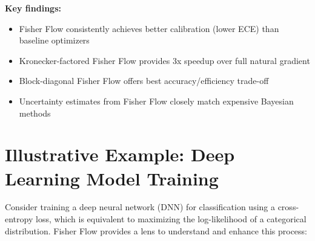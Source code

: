 \documentclass[11pt]{article}
\begin{document}
\textbf{Key findings:}
\begin{itemize}
\item Fisher Flow consistently achieves better calibration (lower ECE) than baseline optimizers
\item Kronecker-factored Fisher Flow provides 3x speedup over full natural gradient
\item Block-diagonal Fisher Flow offers best accuracy/efficiency trade-off
\item Uncertainty estimates from Fisher Flow closely match expensive Bayesian methods
\end{itemize}

\section{Illustrative Example: Deep Learning Model Training}
Consider training a deep neural network (DNN) for classification using a cross-entropy loss, which is equivalent to maximizing the log-likelihood of a categorical distribution. Fisher Flow provides a lens to understand and enhance this process:
\end{document}
